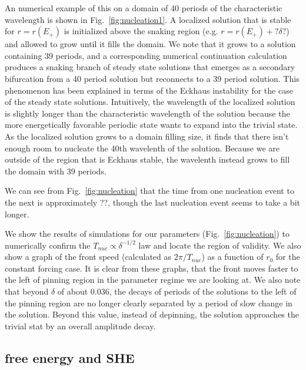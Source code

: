 \documentclass[../main/TimeForcingSHE.tex]{subfiles}
\begin{document}
An numerical example of this on a domain of 40 periods of the characteristic wavelength is shown in Fig.~\ref{fig:nucleation1}.  A localized solution that is stable for $r=r(E_+)$ is initialized above the snaking region (e.g. $r=r(E_+)+ ?\delta?$) and allowed to grow until it fills the domain. We note that it grows to a solution containing 39 periods, and a corresponding numerical continuation calculation produces a snaking branch of steady state solutions that emerges as a secondary bifurcation from a 40 period solution but reconnects to a 39 period solution.  This phenomenon has been explained \cite{bergeon2008} in terms of the Eckhaus instability for the case of the steady state solutions.  Intuitively, the wavelength of the localized solution is slightly longer than the characteristic wavelength of the solution because the more energetically favorable periodic state wants to expand into the trivial state.  As the localized solution grows to a domain filling size, it finds that there isn't enough room to nucleate the 40th wavelenth of the solution.  Because we are outside of the region that is Eckhaus stable, the wavelenth instead grows to fill the domain with 39 periods.

We can see from Fig.~\ref{fig:nucleation} that the time from one nucleation event to the next is approximately ??, though the last nucleation event seems to take a bit longer.  %

\FIGnucleation

We show the results of simulations  for our parameters (Fig.~\ref{fig:nucleation}) to numerically confirm the $T_{nuc}\propto \delta^{-1/2}$ law  and locate the region of validity.  We also show a graph of the front speed (calculated as $2 \pi / T_{nuc}$) as a function of $r_0$ for the constant forcing case.   It is clear from these graphs, that the front moves faster to the left of pinning region in the parameter regime we are looking at.  We also note that beyond $\delta$ of about 0.036, the decays of periods of the solutions to the left of the pinning region are no longer clearly separated by a period of slow change in the solution.  Beyond this value, instead of depinning, the solution approaches the trivial stat by an overall amplitude decay.


\subsection{free energy and SHE}
\end{document}
